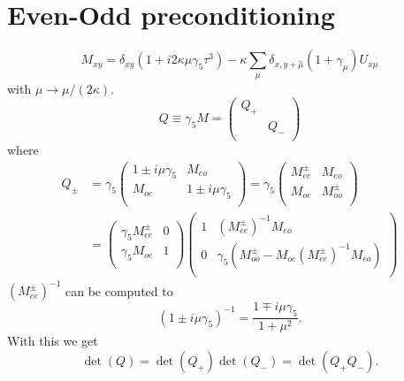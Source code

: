 \section*{Even-Odd preconditioning}

\begin{equation}
  \label{eq:eo0}
  M_{xy} =\delta_{xy}(1+i2\kappa\mu\gamma_5\tau^3) - \kappa\sum_\mu \delta_{x,y+\hat\mu}(1+\gamma_\mu) U_{x\mu}
\end{equation}
with $\mu \to \mu/(2\kappa)$.
\begin{equation}
  \label{eq:eo1}
  Q\equiv \gamma_5 M = \begin{pmatrix}
      Q_+ & \\\
         & Q_- \\
      \end{pmatrix}
\end{equation}
where
\begin{equation}
  \label{eq:eo2}
  \begin{split}
    Q_\pm &= \gamma_5\begin{pmatrix}
      1\pm i\mu\gamma_5 & M_{eo} \\
      M_{oe}    & 1\pm i\mu\gamma_5 \\
    \end{pmatrix} =
    \gamma_5\begin{pmatrix}
      M_{ee}^\pm & M_{eo} \\
      M_{oe}    & M_{oo}^\pm \\
    \end{pmatrix} \\
    & =
    \begin{pmatrix}
      \gamma_5M_{ee}^\pm & 0 \\
      \gamma_5M_{oe}  & 1 \\
    \end{pmatrix}
    \begin{pmatrix}
      1       & (M_{ee}^\pm)^{-1}M_{eo}\\
      0       & \gamma_5(M_{oo}^\pm-M_{oe}(M_{ee}^\pm)^{-1}M_{eo})\\
    \end{pmatrix}
\end{split}
\end{equation}
$(M_{ee}^\pm)^{-1}$ can be computed to 
\[
(1\pm i\mu\gamma_5)^{-1} = \frac{1\mp i\mu\gamma_5}{1+\mu^2}.
\]
With this we get
\begin{equation}
  \label{eq:eo3}
  \det(Q)=\det(Q_+)\det(Q_-) = \det(Q_+ Q_-).
\end{equation}
